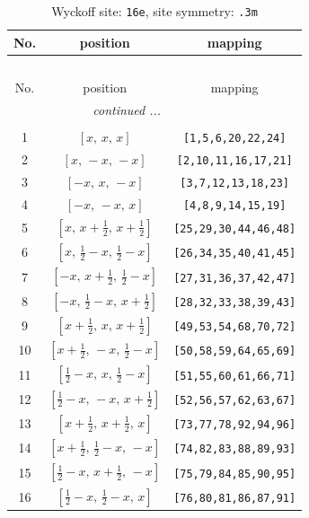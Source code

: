 \documentclass[fleqn,8pt]{jsarticle}
\begin{document}
\begin{longtable}{ccc}
\caption{Wyckoff site: {\tt 16e}, site symmetry: {\tt .3m}}
 \\
 \hline \hline
No. & position & mapping \\ \hline \endfirsthead

\multicolumn{2}{l}{\tablename\ \thetable{}} \\
 \hline \hline
No. & position & mapping \\ \hline \endhead

 \hline \hline
\multicolumn{2}{r}{\footnotesize\it continued ...} \\ \endfoot

 \hline \hline
\multicolumn{2}{r}{} \\ \endlastfoot

1 & $\left[ x,\, x,\, x \right]$ & {\tt [1,5,6,20,22,24]} \\ \hline
2 & $\left[ x,\, - x,\, - x \right]$ & {\tt [2,10,11,16,17,21]} \\ \hline
3 & $\left[ - x,\, x,\, - x \right]$ & {\tt [3,7,12,13,18,23]} \\ \hline
4 & $\left[ - x,\, - x,\, x \right]$ & {\tt [4,8,9,14,15,19]} \\ \hline
5 & $\left[ x,\, x + \frac{1}{2},\, x + \frac{1}{2} \right]$ & {\tt [25,29,30,44,46,48]} \\ \hline
6 & $\left[ x,\, \frac{1}{2} - x,\, \frac{1}{2} - x \right]$ & {\tt [26,34,35,40,41,45]} \\ \hline
7 & $\left[ - x,\, x + \frac{1}{2},\, \frac{1}{2} - x \right]$ & {\tt [27,31,36,37,42,47]} \\ \hline
8 & $\left[ - x,\, \frac{1}{2} - x,\, x + \frac{1}{2} \right]$ & {\tt [28,32,33,38,39,43]} \\ \hline
9 & $\left[ x + \frac{1}{2},\, x,\, x + \frac{1}{2} \right]$ & {\tt [49,53,54,68,70,72]} \\ \hline
10 & $\left[ x + \frac{1}{2},\, - x,\, \frac{1}{2} - x \right]$ & {\tt [50,58,59,64,65,69]} \\ \hline
11 & $\left[ \frac{1}{2} - x,\, x,\, \frac{1}{2} - x \right]$ & {\tt [51,55,60,61,66,71]} \\ \hline
12 & $\left[ \frac{1}{2} - x,\, - x,\, x + \frac{1}{2} \right]$ & {\tt [52,56,57,62,63,67]} \\ \hline
13 & $\left[ x + \frac{1}{2},\, x + \frac{1}{2},\, x \right]$ & {\tt [73,77,78,92,94,96]} \\ \hline
14 & $\left[ x + \frac{1}{2},\, \frac{1}{2} - x,\, - x \right]$ & {\tt [74,82,83,88,89,93]} \\ \hline
15 & $\left[ \frac{1}{2} - x,\, x + \frac{1}{2},\, - x \right]$ & {\tt [75,79,84,85,90,95]} \\ \hline
16 & $\left[ \frac{1}{2} - x,\, \frac{1}{2} - x,\, x \right]$ & {\tt [76,80,81,86,87,91]} \\
\end{longtable}
\end{document}
